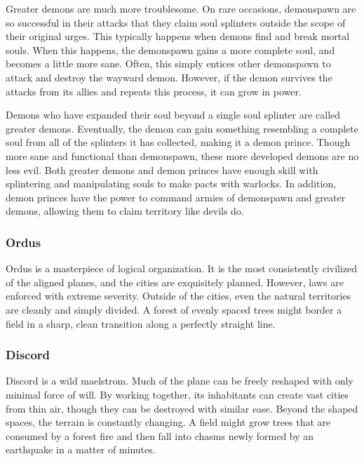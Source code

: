                 Greater demons are much more troublesome.
                On rare occasions, demonspawn are so successful in their attacks that they claim soul splinters outside the scope of their original urges.
                This typically happens when demons find and break mortal souls.
                When this happens, the demonspawn gains a more complete soul, and becomes a little more sane.
                Often, this simply entices other demonspawn to attack and destroy the wayward demon.
                However, if the demon survives the attacks from its allies and repeats this process, it can grow in power.

                Demons who have expanded their soul beyond a single soul splinter are called greater demons.
                Eventually, the demon can gain something resembling a complete soul from all of the splinters it has collected, making it a demon prince.
                Though more sane and functional than demonspawn, these more developed demons are no less evil.
                Both greater demons and demon princes have enough skill with splintering and manipulating souls to make pacts with warlocks.
                In addition, demon princes have the power to command armies of demonspawn and greater demons, allowing them to claim territory like devils do.

            \subsubsection{Ordus}
                Ordus is a masterpiece of logical organization.
                It is the most consistently civilized of the aligned planes, and the cities are exquisitely planned.
                However, laws are enforced with extreme severity.
                Outside of the cities, even the natural territories are cleanly and simply divided.
                A forest of evenly spaced trees might border a field in a sharp, clean transition along a perfectly straight line.

            \subsubsection{Discord}
                Discord is a wild maelstrom.
                Much of the plane can be freely reshaped with only minimal force of will.
                By working together, its inhabitants can create vast cities from thin air, though they can be destroyed with similar ease.
                Beyond the shaped spaces, the terrain is constantly changing.
                A field might grow trees that are consumed by a forest fire and then fall into chasms newly formed by an earthquake in a matter of minutes.

